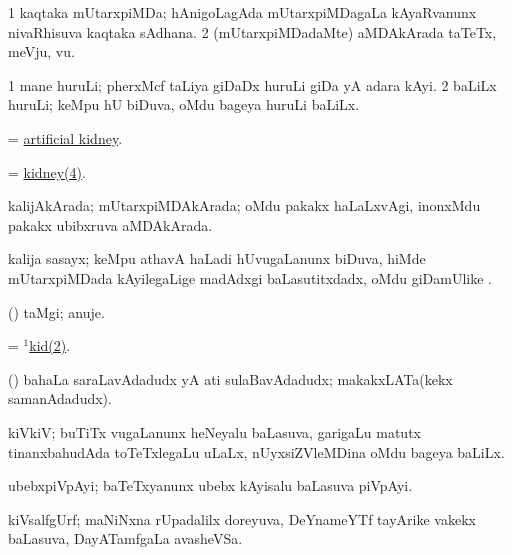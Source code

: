 \noindent
\gl{\pagu}
\bmng
\bnum
\num{1}  kaqtaka mUtarxpiMDa; hAnigoLagAda mUtarxpiMDagaLa kAyaRvanunx nivaRhisuva kaqtaka sAdhana. 
\num{2}  (mUtarxpiMDadaMte) aMDAkArada taTeTx, meVju, \mo vu. 
\enum
\emng
\eentry

\bentry
{}
\gl{\nA}
\bmng
\bnum
\num{1} mane huruLi; pherxMcf taLiya giDaDx huruLi giDa yA adara kAyi. 
\num{2} baLiLx huruLi; keMpu hU biDuva, oMdu bageya huruLi baLiLx. 
\enum
\emng
\eentry

\bentry
{}
\gl{\nA}
\bmng
= \hyperref{kandict_a.pdf}{A}{artificial kidney}{artificial kidney}. 
\emng
\eentry

\bentry
{}
\gl{\nA}
\bmng
 = \hyperlink{kidney(4)}{kidney(4)}. 
\emng
\eentry

\bentry
{}
\gl{\gu}
\bmng
kalijAkArada; mUtarxpiMDAkArada; oMdu pakakx haLaLxvAgi, inonxMdu pakakx ubibxruva aMDAkArada. 
\emng
\eentry

\bentry
{}
\gl{\nA}
\bmng
kalija sasayx; keMpu athavA haLadi hUvugaLanunx biDuva, hiMde mUtarxpiMDada kAyilegaLige madAdxgi baLasutitxdadx, oMdu giDamUlike . 
\emng
\eentry

\bentry
{}
\gl{\nA}
\bmng
(\ashi) taMgi; anuje. 
\emng
\eentry

\bentry
{}
\gl{\nA}
\bmng
 = \hyperlink{kid(1)2}{$^1$kid(2)}. 
\emng
\eentry

\bentry
{}
\gl{\nA}
\bmng
(\ashi) bahaLa saraLavAdadudx yA ati sulaBavAdadudx; makakxLATa(kekx samanAdadudx). 
\emng
\eentry

\bentry
{}
\gl{\nA}
\bmng
kiVkiV; buTiTx \mo vugaLanunx heNeyalu baLasuva, garigaLu matutx tinanxbahudAda toTeTxlegaLu uLaLx, nUyxsiZVleMDina oMdu bageya baLiLx. 
\emng
\eentry

\bentry
{}
\gl{\nA}
\bmng
ubebxpiVpAyi; baTeTxyanunx ubebx kAyisalu baLasuva piVpAyi. 
\emng
\eentry

\bentry
{}
\gl{\nA}
\bmng
kiVsalfgUrf; maNiNxna rUpadalilx doreyuva, DeYnameYTf tayArike \mo vakekx baLasuva, DayATamfgaLa avasheVSa. 
\emng
\eentry

